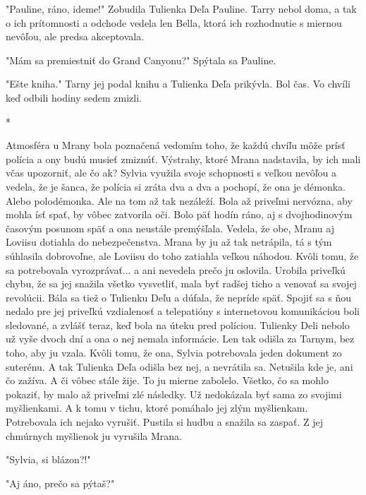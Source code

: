 \documentclass{book}
\begin{document}
"$ $Pauline, ráno, ideme!"$ $  Zobudila Tulienka Deľa Pauline. Tarry nebol doma, a tak o ich prítomnosti a odchode vedela len Bella, ktorá ich rozhodnutie s miernou nevôľou, ale predsa akceptovala.

"$ $Mám sa premiestniť do Grand Canyonu?"$ $  Spýtala sa Pauline.

"$ $Ešte kniha."$ $  Tarny jej podal knihu a Tulienka Deľa prikývla. Bol čas. Vo chvíli keď odbili hodiny sedem zmizli.

\begin{center}

*

\end{center}

Atmosféra u Mrany bola poznačená vedomím toho, že každú chvíľu môže prísť polícia a ony budú musieť zmiznúť. Výstrahy, ktoré Mrana nadstavila, by ich mali včas upozorniť, ale čo ak? Sylvia využila svoje schopnosti s veľkou nevôľou a vedela, že je šanca, že polícia si zráta dva a dva a pochopí, že ona je démonka. Alebo polodémonka. Ale na tom až tak nezáleží. Bola až priveľmi nervózna, aby mohla ísť spať, by vôbec zatvorila oči. Bolo päť hodín ráno, aj s dvojhodinovým časovým posunom späť a ona neustále premýšľala. Vedela, že obe, Mranu aj Loviisu dotiahla do nebezpečenstva. Mrana by ju až tak netrápila, tá s tým súhlasila dobrovoľne, ale Loviisu do toho zatiahla veľkou náhodou. Kvôli tomu, že sa potrebovala vyrozprávať... a ani nevedela prečo ju oslovila. Urobila priveľkú chybu, že sa jej snažila všetko vysvetliť, mala byť radšej ticho a venovať sa svojej revolúcii. Bála sa tiež o Tulienku Deľu a dúfala, že nepríde späť. Spojiť sa s ňou nedalo pre jej priveľkú vzdialenosť a telepatióny s internetovou komunikáciou boli sledované, a zvlášť teraz, keď bola na úteku pred políciou. Tulienky Deli nebolo už vyše dvoch dní a ona o nej nemala informácie. Len tak odišla za Tarnym, bez toho, aby ju vzala. Kvôli tomu, že ona, Sylvia potrebovala jeden dokument zo suterénu. A tak Tulienka Deľa odišla bez nej, a nevrátila sa. Netušila kde je, ani čo zažíva. A či vôbec stále žije. To ju mierne zabolelo. Všetko, čo sa mohlo pokaziť, by malo až priveľmi zlé následky. Už nedokázala byť sama zo svojimi myšlienkami. A k tomu v tichu, ktoré pomáhalo jej zlým myšlienkam. Potrebovala ich nejako vyrušiť. Pustila si hudbu a snažila sa zaspať. Z jej chmúrnych myšlienok ju vyrušila Mrana.

"$ $Sylvia, si blázon?!"$ $ 

"$ $Aj áno, prečo sa pýtaš?"$ $ 
\end{document}
